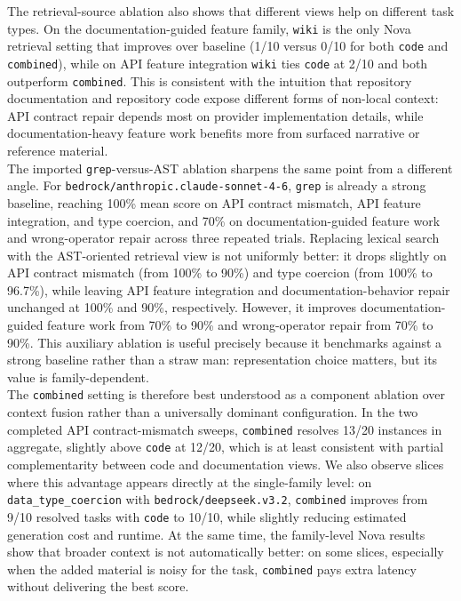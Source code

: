 \documentclass[a4paper,12pt]{article}
\begin{document}
The retrieval-source ablation also shows that different views help on different task types. On the documentation-guided feature family, \texttt{wiki} is the only Nova retrieval setting that improves over baseline (1/10 versus 0/10 for both \texttt{code} and \texttt{combined}), while on API feature integration \texttt{wiki} ties \texttt{code} at 2/10 and both outperform \texttt{combined}. This is consistent with the intuition that repository documentation and repository code expose different forms of non-local context: API contract repair depends most on provider implementation details, while documentation-heavy feature work benefits more from surfaced narrative or reference material.\\

The imported \texttt{grep}-versus-AST ablation sharpens the same point from a different angle. For \texttt{bedrock/anthropic.claude-sonnet-4-6}, \texttt{grep} is already a strong baseline, reaching 100\% mean score on API contract mismatch, API feature integration, and type coercion, and 70\% on documentation-guided feature work and wrong-operator repair across three repeated trials. Replacing lexical search with the AST-oriented retrieval view is not uniformly better: it drops slightly on API contract mismatch (from 100\% to 90\%) and type coercion (from 100\% to 96.7\%), while leaving API feature integration and documentation-behavior repair unchanged at 100\% and 90\%, respectively. However, it improves documentation-guided feature work from 70\% to 90\% and wrong-operator repair from 70\% to 90\%. This auxiliary ablation is useful precisely because it benchmarks against a strong baseline rather than a straw man: representation choice matters, but its value is family-dependent.\\

The \texttt{combined} setting is therefore best understood as a component ablation over context fusion rather than a universally dominant configuration. In the two completed API contract-mismatch sweeps, \texttt{combined} resolves 13/20 instances in aggregate, slightly above \texttt{code} at 12/20, which is at least consistent with partial complementarity between code and documentation views. We also observe slices where this advantage appears directly at the single-family level: on \texttt{data\_type\_coercion} with \texttt{bedrock/deepseek.v3.2}, \texttt{combined} improves from 9/10 resolved tasks with \texttt{code} to 10/10, while slightly reducing estimated generation cost and runtime. At the same time, the family-level Nova results show that broader context is not automatically better: on some slices, especially when the added material is noisy for the task, \texttt{combined} pays extra latency without delivering the best score.\\
\end{document}

